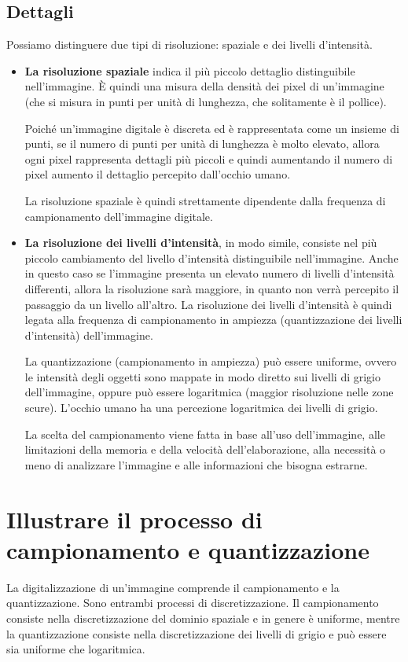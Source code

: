 \subsection{Dettagli}
Possiamo distinguere due tipi di risoluzione: spaziale e dei livelli d'intensità.
\begin{itemize}

\item \textbf{La risoluzione spaziale} indica il più piccolo dettaglio distinguibile nell'immagine. È quindi una misura della densità dei pixel di un'immagine (che si misura in punti per unità di lunghezza, che solitamente è il pollice).

Poiché un'immagine digitale è discreta ed è rappresentata come un insieme di punti, se il numero di punti per unità di lunghezza è molto elevato, allora ogni pixel rappresenta dettagli più piccoli e quindi aumentando il numero di pixel aumento il dettaglio percepito dall'occhio umano.

La risoluzione spaziale è quindi strettamente dipendente dalla frequenza di campionamento dell'immagine digitale.

\item \textbf{La risoluzione dei livelli d'intensità}, in modo simile,  consiste nel più piccolo cambiamento del livello d'intensità distinguibile nell'immagine. Anche in questo caso se l'immagine presenta un elevato numero di livelli d'intensità differenti, allora la risoluzione sarà maggiore, in quanto non verrà percepito il passaggio da un livello all'altro. La risoluzione dei livelli d'intensità è quindi legata alla frequenza di campionamento in ampiezza (quantizzazione dei livelli d'intensità) dell'immagine.

La quantizzazione (campionamento in ampiezza) può essere uniforme, ovvero le intensità degli oggetti sono mappate in modo diretto sui livelli di grigio dell'immagine, oppure può essere logaritmica (maggior risoluzione nelle zone scure). L'occhio umano ha una percezione logaritmica dei livelli di grigio.

La scelta del campionamento viene fatta in base all'uso dell'immagine, alle limitazioni della memoria e della velocità dell'elaborazione, alla necessità o meno di analizzare l'immagine e alle informazioni che bisogna estrarne.
\end{itemize}

\section{Illustrare il processo di campionamento e quantizzazione}
La digitalizzazione di un'immagine comprende il campionamento e la quantizzazione. Sono entrambi processi di discretizzazione. Il campionamento consiste nella discretizzazione del dominio spaziale e in genere è uniforme, mentre la quantizzazione consiste nella discretizzazione dei livelli di grigio e può essere sia uniforme che logaritmica.

